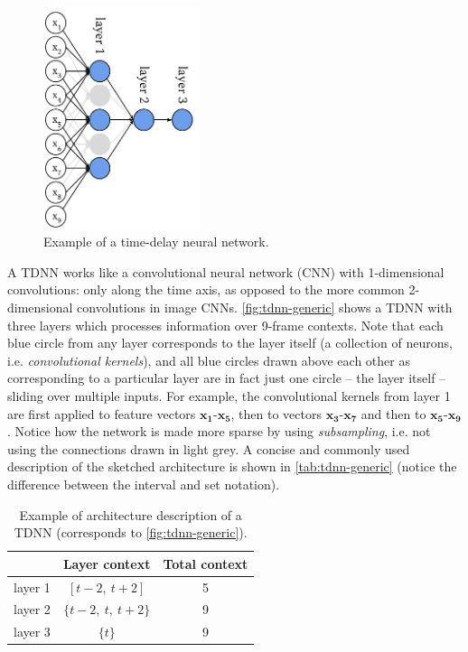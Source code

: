 \documentclass[bsc,frontabs,twoside,singlespacing,parskip,deptreport]{infthesis}
\def\abovestrut#1{\rule[0in]{0in}{#1}\ignorespaces}
\def\abovespace{\abovestrut{0.17in}}
\begin{document}
{{    %
    \begin{figure}[h!]
      \centering
      \includegraphics[height=6.5cm]{graphics/tdnn-generic}
      \caption{Example of a time-delay neural network.}
      \label{fig:tdnn-generic}
    \end{figure}
    A TDNN works like a convolutional neural network (CNN) with 1-dimensional convolutions: only along the time axis, as opposed to the more common 2-dimensional convolutions in image CNNs. \autoref{fig:tdnn-generic} shows a TDNN with three layers which processes information over 9-frame contexts. Note that each blue circle from any layer corresponds to the layer itself (a collection of neurons, i.e. \textit{convolutional kernels}), and all blue circles drawn above each other as corresponding to a particular layer are in fact just one circle -- the layer itself -- sliding over multiple inputs. For example, the convolutional kernels from layer 1 are first applied to feature vectors $\mathbf{x_1}$-$\mathbf{x_5}$, then to vectors $\mathbf{x_3}$-$\mathbf{x_7}$ and then to $\mathbf{x_5}$-$\mathbf{x_9}$. Notice how the network is made more sparse by using \textit{subsampling}, i.e. not using the connections drawn in light grey. A concise and commonly used description of the sketched architecture is shown in \autoref{tab:tdnn-generic} (notice the difference between the interval and set notation).
    \begin{table}[h!tb]
      \centering
      \begin{sc}
        \begin{tabular}{c|cc}
                      & Layer context      & Total context \\
          \hline
          \abovespace
          layer 1     & $[t-2,\ t+2]$      & 5 \\
          \abovespace
          layer 2     & $\{t-2,\ t,\ t+2\}$& 9 \\
          \abovespace
          layer 3     & $\{t\}$            & 9 \\
        \end{tabular}
      \end{sc}
      \caption{Example of architecture description of a TDNN (corresponds to \autoref{fig:tdnn-generic}).}
      \label{tab:tdnn-generic}
    \end{table}

}}
\end{document}
